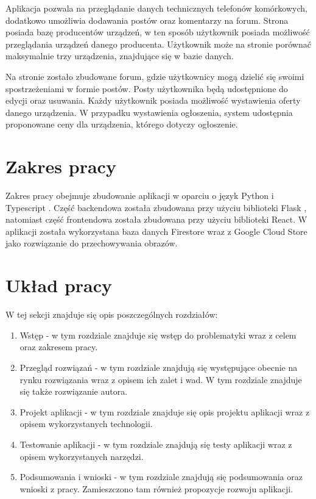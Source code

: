 Aplikacja pozwala na przeglądanie danych technicznych telefonów komórkowych, dodatkowo umożliwia dodawania postów oraz komentarzy na forum. Strona posiada bazę producentów urządzeń, w ten sposób użytkownik posiada możliwość przeglądania urządzeń danego producenta. Użytkownik może na stronie porównać maksymalnie trzy urządzenia, znajdujące się w bazie danych.

Na stronie zostało zbudowane forum, gdzie użytkownicy mogą dzielić się swoimi spostrzeżeniami w formie postów. Posty użytkownika będą udostępnione do edycji oraz usuwania. Każdy użytkownik posiada możliwość wystawienia oferty danego urządzenia. W przypadku wystawienia ogłoszenia, system udostępnia proponowane ceny dla urządzenia, którego dotyczy ogłoszenie.

\section{Zakres pracy}
Zakres pracy obejmuje zbudowanie aplikacji w oparciu o język Python \cite{python} i Typescript \cite*{TypeScript}. Część backendowa została zbudowana przy użyciu biblioteki Flask \cite{flask}, natomiast część frontendowa została zbudowana przy użyciu biblioteki React. W aplikacji została wykorzystana baza danych Firestore wraz z Google Cloud Store jako rozwiązanie do przechowywania obrazów. 

\section{Układ pracy}
W tej sekcji znajduje się opis poszczególnych rozdziałów:
\begin{enumerate}
  \item Wstęp - w tym rozdziale znajduje się wstęp do problematyki wraz z celem oraz zakresem pracy.
  \item Przegląd rozwiązań - w tym rozdziale znajdują się występujące obecnie na rynku rozwiązania wraz z opisem ich zalet i wad. W tym rozdziale znajduje się także rozwiązanie autora.
  \item Projekt aplikacji - w tym rozdziale znajduje się opis projektu aplikacji wraz z opisem wykorzystanych technologii.
  \item Testowanie aplikacji - w tym rozdziale znajdują się testy aplikacji wraz z opisem wykorzystanych narzędzi.
  \item Podsumowania i wnioski - w tym rozdziale znajdują się podsumowania oraz wnioski z pracy. Zamieszczono tam również propozycje rozwoju aplikacji.
\end{enumerate}
